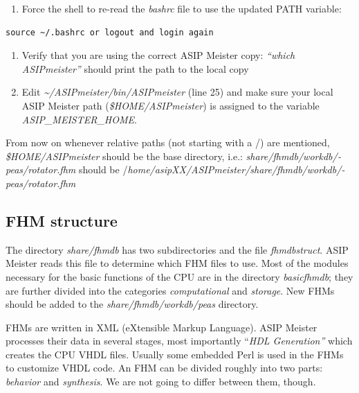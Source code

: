 \begin{enumerate}
\def\labelenumi{\arabic{enumi}.}
\setcounter{enumi}{2}
\item
  Force the shell to re-read the \emph{bashrc} file to use the updated
  PATH variable:
\end{enumerate}

\begin{lstlisting}
source ~/.bashrc or logout and login again
\end{lstlisting}

\begin{enumerate}
\def\labelenumi{\arabic{enumi}.}
\setcounter{enumi}{3}
\item
  Verify that you are using the correct ASIP Meister copy: \emph{``which
  ASIPmeister''} should print the path to the local copy
\item
  Edit \emph{\textasciitilde/ASIPmeister/bin/ASIPmeister} (line 25) and
  make sure your local ASIP Meister path (\emph{\$HOME/ASIPmeister}) is
  assigned to the variable \emph{ASIP\_MEISTER\_HOME}.
\end{enumerate}

From now on whenever relative paths (not starting with a /) are
mentioned, \emph{\$HOME/ASIPmeister} should be the base directory, i.e.:
\emph{share/­fhmdb/­workdb/­peas/­rotator.fhm} should be
/\emph{home/­asipXX/­ASIPmeister/­share/­fhmdb/­workdb/­peas/­rotator.fhm}

\hypertarget{fhm-structure}{%
\subsection{FHM structure}\label{fhm-structure}}

The directory \emph{share/fhmdb} has two subdirectories and the file
\emph{fhmdbstruct}. ASIP Meister reads this file to determine which FHM
files to use. Most of the modules necessary for the basic functions of
the CPU are in the directory \emph{basicfhmdb}; they are further divided
into the categories \emph{computational} and \emph{storage}. New FHMs
should be added to the \emph{share/­fhmdb/­workdb/­peas} directory.

FHMs are written in XML (eXtensible Markup Language). ASIP Meister
processes their data in several stages, most importantly ``\emph{HDL
Generation''} which creates the CPU VHDL files. Usually some embedded
Perl is used in the FHMs to customize VHDL code. An FHM can be divided
roughly into two parts: \emph{behavior} and \emph{synthesis}. We are not
going to differ between them, though.

